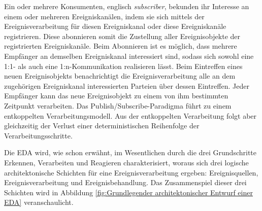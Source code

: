 Ein oder mehrere Konsumenten, englisch \textit{subscriber}, bekunden ihr Interesse an einem oder mehreren Ereigniskanälen, indem sie sich mittels der Ereignisverarbeitung für diesen Ereigniskanal oder diese Ereigniskanäle registrieren. 
Diese abonnieren somit die Zustellung aller Ereignisobjekte der registrierten Ereigniskanäle.
Beim Abonnieren ist es möglich, dass mehrere Empfänger an demselben Ereigniskanal interessiert sind, sodass sich sowohl eine 1:1- als auch eine 1:n-Kommunikation realisieren lässt. 
Beim Eintreffen eines neuen Ereignisobjekts benachrichtigt die Ereignisverarbeitung alle an dem zugehörigen Ereigniskanal interessierten Parteien über dessen Eintreffen. 
Jeder Empfänger kann das neue Ereignisobjekt zu einem von ihm bestimmten Zeitpunkt verarbeiten.
\cite{Schaaf.2015}
Das Publish/Subscribe-Paradigma führt zu einem entkoppelten Verarbeitungsmodell. Aus der entkoppelten Verarbeitung folgt aber gleichzeitig der Verlust einer deterministischen Reihenfolge der Verarbeitungsschritte.
\cite{Bruns.2010}

Die \ac{EDA} wird, wie schon erwähnt, im Wesentlichen durch die drei Grundschritte Erkennen, Verarbeiten und Reagieren charakterisiert, woraus sich drei logische architektonische Schichten für eine Ereignisverarbeitung ergeben: Ereignisquellen, Ereignisverarbeitung und Ereignisbehandlung. Das
Zusammenspiel dieser drei Schichten wird  in Abbildung \ref{fig:Grundlegender architektonischer Entwurf einer EDA} veranschaulicht.


